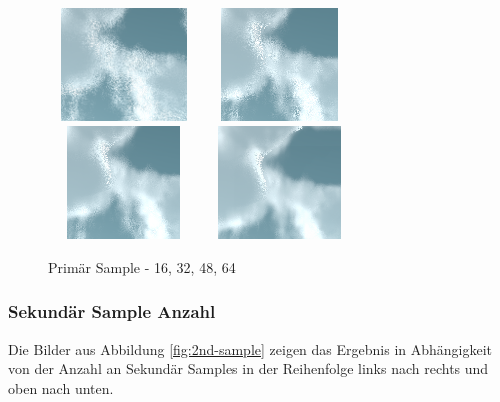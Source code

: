 \begin{figure}[H]
    \centering
    \includegraphics[width=4cm, height=3cm]{media/1st-sample-16.png}
    \includegraphics[width=4cm, height=3cm]{media/1st-sample-32.png}
    \includegraphics[width=4cm, height=3cm]{media/1st-sample-48.png}
    \includegraphics[width=4cm, height=3cm]{media/1st-sample-64.png}
    \caption{Primär Sample - 16, 32, 48, 64}
    \label{fig:1st-sample}
\end{figure}

\subsubsection{Sekundär Sample Anzahl}
Die Bilder aus Abbildung \ref{fig:2nd-sample} zeigen das Ergebnis in Abhängigkeit von der Anzahl an Sekundär Samples in der Reihenfolge links nach rechts und oben nach unten.

